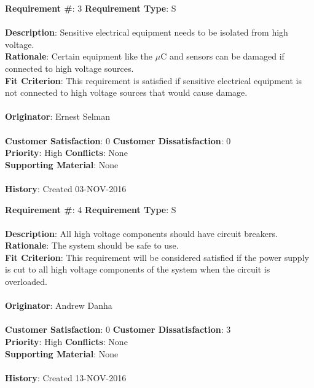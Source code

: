 \documentclass[titlepage]{article}
\begin{document}
\begin{framed}
	\noindent\textbf{Requirement \#}: 3 \hfill \textbf{Requirement Type}: S \hfill\\\\
	\noindent\textbf{Description}: Sensitive electrical equipment needs to be isolated from high voltage.\\
	\textbf{Rationale}: Certain equipment like the $\mu$C and sensors can be damaged if connected to high voltage sources.\\
	\textbf{Fit Criterion}: This requirement is satisfied if sensitive electrical equipment is not connected to high voltage sources that would cause damage.\\\\
	\textbf{Originator}: Ernest Selman\\\\
	\noindent\textbf{Customer Satisfaction}: 0 \hfill 	\textbf{Customer Dissatisfaction}: 0 \hfill\\
	\textbf{Priority}: High \hfill \textbf{Conflicts}: None \hfill\\
	\textbf{Supporting Material}: None\\\\
	\noindent\textbf{History}: Created 03-NOV-2016
\end{framed}

\begin{framed}
	\noindent\textbf{Requirement \#}: 4 \hfill \textbf{Requirement Type}: S \hfill\\\\
	\noindent\textbf{Description}: All high voltage components should have circuit breakers.\\
	\textbf{Rationale}: The system should be safe to use.\\
	\textbf{Fit Criterion}: This requirement will be considered satisfied if the power supply is cut to all high voltage components of the system when the circuit is overloaded.\\\\
	\textbf{Originator}: Andrew Danha\\\\
	\noindent\textbf{Customer Satisfaction}: 0 \hfill 	\textbf{Customer Dissatisfaction}: 3 \hfill\\
	\textbf{Priority}: High \hfill \textbf{Conflicts}: None \hfill\\
	\textbf{Supporting Material}: None\\\\
	\noindent\textbf{History}: Created 13-NOV-2016
\end{framed}
\end{document}
